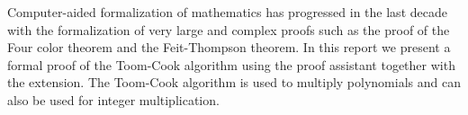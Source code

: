 Computer-aided formalization of mathematics has progressed in the last decade
with the formalization of very large and complex proofs such as the proof of
the Four color theorem and the Feit-Thompson theorem. In this report we present
a formal proof of the Toom-Cook algorithm using the \coq{} proof assistant
together with the \ssr{} extension. The Toom-Cook algorithm is used to multiply
polynomials and can also be used for integer multiplication.

